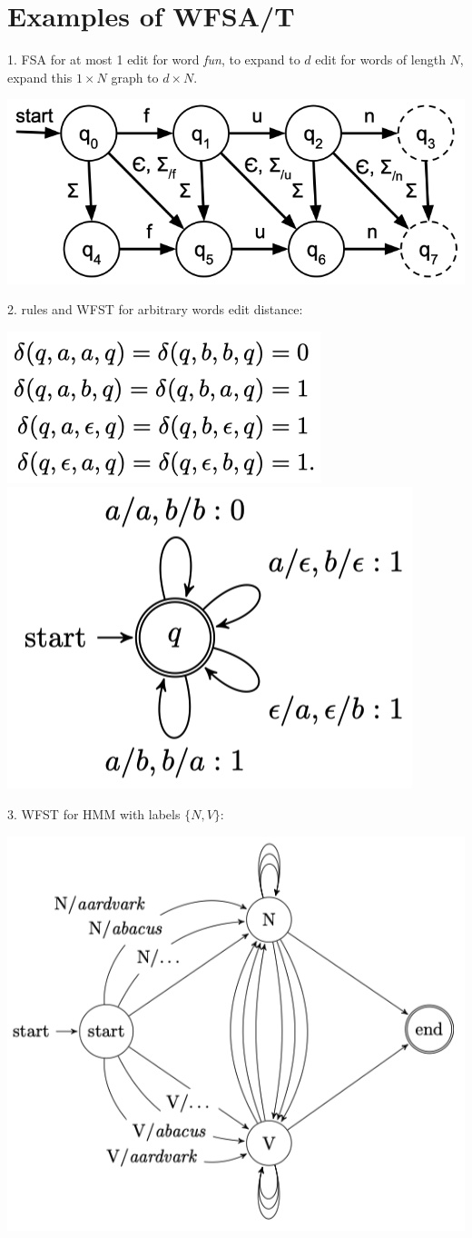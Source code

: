 \section{Examples of WFSA/T}
1. FSA for at most 1 edit for word \textit{fun}, to expand to $d$ edit for words of length $N$, expand this $1\times N$ graph to $d\times N$.
\begin{center}
    \includegraphics[width=.65\columnwidth]{img/FSA-edit.png}
\end{center}

2.  rules and WFST for arbitrary words edit distance:
\begin{center}
    \includegraphics[width=0.49\columnwidth]{img/WFST-edit-rules.png}
    \includegraphics[width=0.35\columnwidth]{img/WFST-edit.png}
\end{center}

3. WFST for HMM with labels $\{N,V\}$:
\begin{center}
    \includegraphics[width=0.4\columnwidth]{img/WFST-HMM.png}
\end{center}

